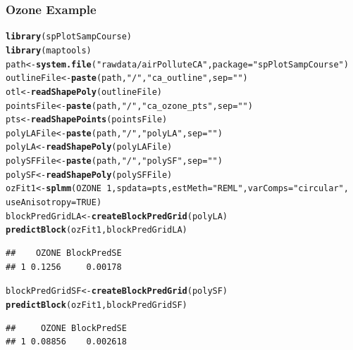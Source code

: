 \documentclass[mathserif,compress]{beamer}\usepackage{graphicx, color}
\makeatletter
\newcommand{\hlfunctioncall}[1]{\textcolor[rgb]{0.501960784313725,0,0.329411764705882}{\textbf{#1}}}%
\newcommand{\hlstring}[1]{\textcolor[rgb]{0.6,0.6,1}{#1}}%
\newenvironment{kframe}{%
 \def\at@end@of@kframe{}%
 \ifinner\ifhmode%
  \def\at@end@of@kframe{\end{minipage}}%
  \begin{minipage}{\columnwidth}%
 \fi\fi%
 \def\FrameCommand##1{\hskip\@totalleftmargin \hskip-\fboxsep
 \colorbox{shadecolor}{##1}\hskip-\fboxsep
     \hskip-\linewidth \hskip-\@totalleftmargin \hskip\columnwidth}%
 \MakeFramed {\advance\hsize-\width
   \@totalleftmargin\z@ \linewidth\hsize
   \@setminipage}}%
 {\par\unskip\endMakeFramed%
 \at@end@of@kframe}
\newenvironment{knitrout}{}{} %
\makeatother
\begin{document}
\begin{frame}[fragile]
\frametitle{Ozone Example}

\begin{knitrout}\tiny
{}\color{fgcolor}\begin{kframe}
\begin{alltt}
\hlfunctioncall{library}(spPlotSampCourse)
\hlfunctioncall{library}(maptools)
path <- \hlfunctioncall{system.file}(\hlstring{"rawdata/airPolluteCA"}, package = \hlstring{"spPlotSampCourse"})
outlineFile <- \hlfunctioncall{paste}(path, \hlstring{"/"}, \hlstring{"ca_outline"}, sep = \hlstring{""})
otl <- \hlfunctioncall{readShapePoly}(outlineFile)
pointsFile <- \hlfunctioncall{paste}(path, \hlstring{"/"}, \hlstring{"ca_ozone_pts"}, sep = \hlstring{""})
pts <- \hlfunctioncall{readShapePoints}(pointsFile)
polyLAFile <- \hlfunctioncall{paste}(path, \hlstring{"/"}, \hlstring{"polyLA"}, sep = \hlstring{""})
polyLA <- \hlfunctioncall{readShapePoly}(polyLAFile)
polySFFile <- \hlfunctioncall{paste}(path, \hlstring{"/"}, \hlstring{"polySF"}, sep = \hlstring{""})
polySF <- \hlfunctioncall{readShapePoly}(polySFFile)
ozFit1 <- \hlfunctioncall{splmm}(OZONE ~ 1, spdata = pts, estMeth = \hlstring{"REML"}, varComps = \hlstring{"circular"}, 
    useAnisotropy = TRUE)
blockPredGridLA <- \hlfunctioncall{createBlockPredGrid}(polyLA)
\hlfunctioncall{predictBlock}(ozFit1, blockPredGridLA)
\end{alltt}
\begin{verbatim}
##    OZONE BlockPredSE
## 1 0.1256     0.00178
\end{verbatim}
\begin{alltt}
blockPredGridSF <- \hlfunctioncall{createBlockPredGrid}(polySF)
\hlfunctioncall{predictBlock}(ozFit1, blockPredGridSF)
\end{alltt}
\begin{verbatim}
##     OZONE BlockPredSE
## 1 0.08856    0.002618
\end{verbatim}
\end{kframe}
\end{knitrout}


\end{frame}

\end{document}
